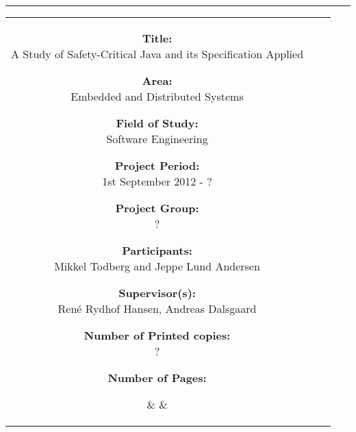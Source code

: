 \begin{titlepage}

\begin{center}
\begin{tabular}{c}
\end{tabular}
\end{center}
\vspace{-3mm}
\hrule

\vspace{5mm}

\hspace{-10mm}
\begin{tabular}{ccc}

\parbox{55mm}{
  \footnotesize
  \begin{description}
  
  \item{\textbf{Title:}          \\ A Study of Safety-Critical Java and its Specification Applied}
  \item{\textbf{Area:}           \\ Embedded and Distributed Systems}
  \item{\textbf{Field of Study:} \\ Software Engineering}
  \item{\textbf{Project Period:} \\ 1st September 2012 - ?}
  \item{\textbf{Project Group:}  \\ ?}
  \item{\textbf{Participants:}   \\ Mikkel Todberg and Jeppe Lund Andersen}
  \item{\textbf{Supervisor(s):}  \\ René Rydhof Hansen, Andreas Dalsgaard}

  \item{\textbf{Number of Printed copies:} \\ ?}
  \item{\textbf{Number of Pages:} \\ \pageref{LastPage}}

  \end{description}
}

&
\hspace{5mm}
&

\fbox{
  \parbox{56mm}{
    \footnotesize
    
  }
}

\end{tabular}

\end{titlepage}
